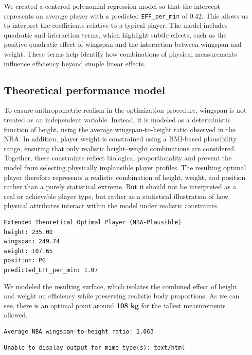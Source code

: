 \documentclass[
  letterpaper,
  DIV=11,
  numbers=noendperiod]{scrartcl}
\begin{document}
We created a centered polynomial regression model so that the intercept
represents an average player with a predicted \texttt{EFF\_per\_min} of
0.42. This allows us to interpret the coefficients relative to a typical
player. The model includes quadratic and interaction terms, which
highlight subtle effects, such as the positive quadratic effect of
wingspan and the interaction between wingspan and weight. These terms
help identify how combinations of physical measurements influence
efficiency beyond simple linear effects.

\subsection{Theoretical performance
model}\label{theoretical-performance-model}

To ensure anthropometric realism in the optimization procedure, wingspan
is not treated as an independent variable. Instead, it is modeled as a
deterministic function of height, using the average wingspan-to-height
ratio observed in the NBA. In addition, player weight is constrained
using a BMI-based plausibility range, ensuring that only realistic
height--weight combinations are considered. Together, these constraints
reflect biological proportionality and prevent the model from selecting
physically implausible player profiles. The resulting optimal player
therefore represents a realistic combination of height, weight, and
position rather than a purely statistical extreme. But it should not be
interpreted as a real or achievable player type, but rather as a
statistical illustration of how physical attributes interact within the
model under realistic constraints.

\begin{verbatim}
Extended Theoretical Optimal Player (NBA-Plausible)
height: 235.00
wingspan: 249.74
weight: 107.65
position: PG
predicted_EFF_per_min: 1.07
\end{verbatim}

We modeled the resulting surface, which isolates the combined effect of
height and weight on efficiency while preserving realistic body
proportions. As we can see, there is an optimal point around \textbf{108
kg} for the tallest measurements allowed.

\begin{verbatim}
Average NBA wingspan-to-height ratio: 1.063
\end{verbatim}

\begin{verbatim}
Unable to display output for mime type(s): text/html
\end{verbatim}
\end{document}

